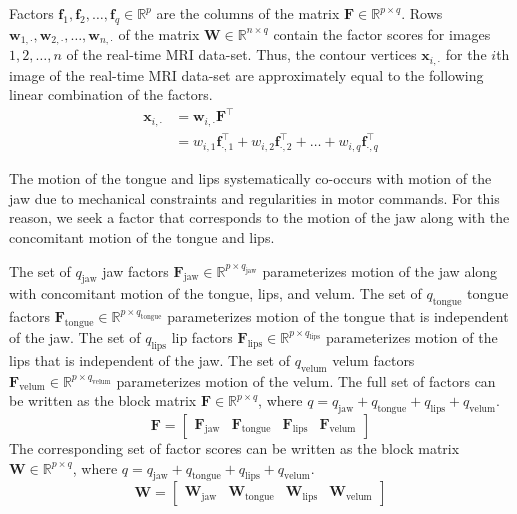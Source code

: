 \documentclass[preprint]{JASAnew}\usepackage[]{graphicx}\usepackage[]{color}
\begin{document}
Factors $\mathbf{f}_1, \mathbf{f}_2, \ldots, \mathbf{f}_q \in \mathbb{R}^p$ are the columns of the matrix $\mathbf{F} \in \mathbb{R}^{p\times q}$. 
%
Rows $\mathbf{w}_{1,\cdot},\mathbf{w}_{2,\cdot},\ldots,\mathbf{w}_{n,\cdot}$ of the matrix $\mathbf{W} \in \mathbb{R}^{n\times q}$ contain the factor scores for images $1,2,\ldots,n$ of the real-time MRI data-set. 
%
Thus, the contour vertices $\mathbf{x}_{i,\cdot}$ for the $i$th image of the real-time MRI data-set are approximately equal to the following linear combination of the factors. 
%
\begin{align}
\label{eq:linearcombo}
\mathbf{x}_{i,\cdot}
 &=
  \mathbf{w}_{i,\cdot} \mathbf{F}^\intercal \\
 &=
  w_{i,1} \mathbf{f}_{\cdot,1}^\intercal
  + w_{i,2} \mathbf{f}_{\cdot,2}^\intercal
  + \ldots
  + w_{i,q} \mathbf{f}_{\cdot,q}^\intercal
\end{align}




The motion of the tongue and lips systematically co-occurs with motion of the jaw due to mechanical constraints and regularities in motor commands. For this reason, we seek a factor that corresponds to the motion of the jaw along with the concomitant motion of the tongue and lips.


The set of $q_\text{jaw}$ jaw factors $\mathbf{F}_\text{jaw} \in \mathbb{R}^{p\times q_\text{jaw}}$ parameterizes motion of the jaw along with concomitant motion of the tongue, lips, and velum.
%
The set of $q_\text{tongue}$ tongue factors $\mathbf{F}_\text{tongue} \in \mathbb{R}^{p\times q_\text{tongue}}$ parameterizes motion of the tongue that is independent of the jaw. 
%
The set of $q_\text{lips}$ lip factors $\mathbf{F}_\text{lips} \in \mathbb{R}^{p\times q_\text{lips}}$ parameterizes motion of the lips that is independent of the jaw.
%
The set of $q_\text{velum}$ velum factors $\mathbf{F}_\text{velum} \in \mathbb{R}^{p\times q_\text{velum}}$ parameterizes motion of the velum.
%
The full set of factors can be written as the block matrix $\mathbf{F} \in \mathbb{R}^{p\times q}$, where $q=q_\text{jaw}+q_\text{tongue}+q_\text{lips}+q_\text{velum}$. 
% 
\begin{equation}
\label{eq:Fblock}
\mathbf{F} = 
\left[
\begin{array}{c|c|c|c}
\mathbf{F}_\text{jaw} 
& \mathbf{F}_\text{tongue}
& \mathbf{F}_\text{lips}
& \mathbf{F}_\text{velum}
\end{array}
\right]
\end{equation}
%
The corresponding set of factor scores can be written as the block matrix $\mathbf{W} \in \mathbb{R}^{p\times q}$, where $q=q_\text{jaw}+q_\text{tongue}+q_\text{lips}+q_\text{velum}$. 
% 
\begin{equation}
\label{eq:Wblock}
\mathbf{W} = 
\left[
\begin{array}{c|c|c|c}
\mathbf{W}_\text{jaw} 
& \mathbf{W}_\text{tongue}
& \mathbf{W}_\text{lips}
& \mathbf{W}_\text{velum}
\end{array}
\right]
\end{equation}
\end{document}
